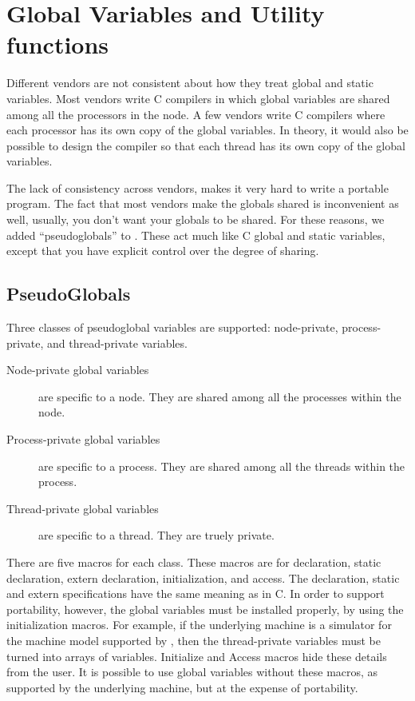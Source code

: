 \section{Global Variables and Utility functions}
\label{globalvars}

Different vendors are not consistent about how they treat global and static
variables.  Most vendors write C compilers in which global variables are
shared among all the processors in the node.  A few vendors write C
compilers where each processor has its own copy of the global variables.
In theory, it would also be possible to design the compiler so that
each thread has its own copy of the global variables.

The lack of consistency across vendors, makes it very hard to write a
portable program.  The fact that most vendors make the globals shared
is inconvenient as well, usually, you don't want your globals to be
shared.  For these reasons, we added ``pseudoglobals'' to \converse{}.
These act much like C global and static variables, except that you have
explicit control over the degree of sharing.

\subsection{\converse{} PseudoGlobals}

Three classes of pseudoglobal variables are supported: node-private,
process-private, and thread-private variables.

\begin{description}
\item[Node-private global variables] are specific to a node. They are
     shared among all the processes within the node.
\item[Process-private global variables]  are specific to a process. They are
     shared among all the threads within the process.
\item[Thread-private global variables] are specific to a thread. They are 
     truely private.
\end{description}

There are five macros for each class. These macros are for
declaration, static declaration, extern declaration, initialization,
and access. The declaration, static and extern specifications have the
same meaning as in C. In order to support portability, however, the
global variables must be installed properly, by using the
initialization macros.  For example, if the underlying machine is a
simulator for the machine model supported by \converse{}, then the
thread-private variables must be turned into arrays of variables.
Initialize and Access macros hide these details from the user.  It is
possible to use global variables without these macros, as supported by
the underlying machine, but at the expense of portability.

